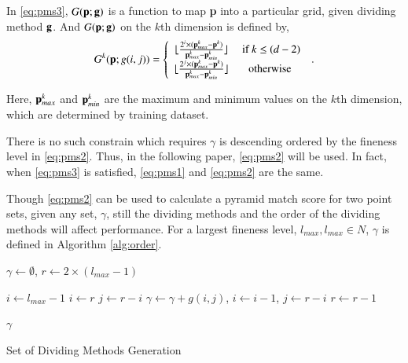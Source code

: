 \documentclass[paper]{ieice}
\begin{document}
In \ref{eq:pms3}, $G({\bf p};{\bf g})$ is a function to map {\bf p} into a particular grid, given dividing method ${\bf g}$. And $G({\bf p};{\bf g})$ on the $k$th dimension is defined by,
\[
G^k({\bf p};{g(i,j)})=
 \left\{ \begin{array}{*{20}{c}}
    \lfloor { \frac{2^i \times ({\bf p}_{max}^k - {\bf p}^k) }{{\bf p}_{max}^k - {\bf p}_{min}^k} }  \rfloor    &\mbox{  if } k \le (d-2) \\
    \lfloor { \frac{2^j \times ({\bf p}_{max}^k - {\bf p}^k) }{{\bf p}_{max}^k - {\bf p}_{min}^k} }  \rfloor  &\mbox{otherwise}
\end{array} \right. \:.
\]

Here, ${\bf p}_{max}^k$ and ${\bf p}_{min}^k$ are the maximum and minimum values on the $k$th dimension, which are determined by training dataset.



There is no such constrain which requires $\gamma$ is descending ordered by the fineness level in \ref{eq:pms2}. Thus, in the following paper, \ref{eq:pms2} will be used.
In fact, when \ref{eq:pms3} is satisfied, \ref{eq:pms1} and \ref{eq:pms2} are the same.

Though \ref{eq:pms2} can be used to calculate a pyramid match score for two point sets, given any set, $\gamma$, still the dividing methods and the order of the dividing methods will affect performance. For a largest fineness level, $l_{max},l_{max}\in N$, $\gamma$ is defined in Algorithm \ref{alg:order}.

\begin{algorithm}[chapter]





    \begin{algorithmic}[1]


       \STATE $\gamma \leftarrow \emptyset$, $r \leftarrow 2\times (l_{max}-1)$

        \STATE $i \leftarrow l_{max}-1$
        \ELSE
        \STATE $i \leftarrow r$
        \ENDIF
        \STATE $j \leftarrow r-i$
        \STATE $\gamma \leftarrow \gamma + g(i,j)$, $i \leftarrow i-1$, $j \leftarrow r-i$
        \ENDWHILE
        \STATE $r \leftarrow r-1$
        \ENDWHILE




    \RETURN $\gamma$

    \end{algorithmic}
    \caption{Set of Dividing Methods Generation}
    \label{alg:order}


\end{algorithm}
\end{document}
